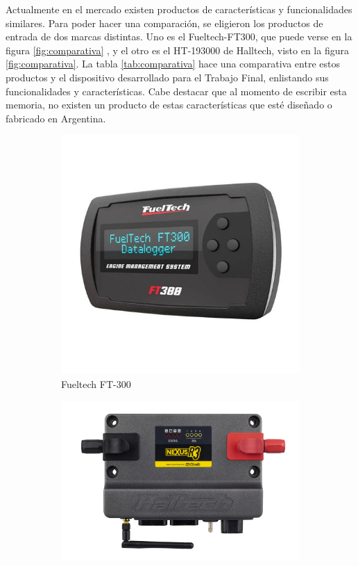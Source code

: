 Actualmente en el mercado existen productos de características y funcionalidades similares. Para poder hacer una comparación, se eligieron los productos de entrada de dos marcas distintas. Uno es el Fueltech-FT300, que puede verse en la figura \ref{fig:comparativa} ,  y el otro es el HT-193000 de Halltech, visto en la figura \ref{fig:comparativa}. La tabla \ref{tab:comparativa} hace una comparativa entre estos productos y el dispositivo desarrollado para el Trabajo Final, enlistando sus funcionalidades y características. Cabe destacar que al momento de escribir esta memoria, no existen un producto de estas características que esté diseñado o fabricado en Argentina.

\begin{figure}[htpb]
\centering
\begin{subfigure}{.4\textwidth}
\centering
\includegraphics[width=\textwidth]{./Figures/fueltech-ft300.jpg}
\caption{Fueltech FT-300}
\label{fig:fueltech}
\end{subfigure}
\hfill
\begin{subfigure}{.5\textwidth}
\centering
\includegraphics[width=\textwidth]{./Figures/HT-193000_00.JPG}

\end{subfigure}
\end{figure}
